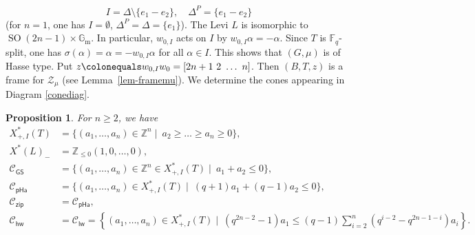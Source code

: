 \documentclass[11pt]{amsart}
\numberwithin{equation}{section}
\newtheorem{proposition}[theorem]{Proposition}
\theoremstyle{definition}
\theoremstyle{remark}
\newcommand{\pha}{\mathsf{pHa}}
\newcommand{\zipsf}{\mathsf{zip}}
\newcommand{\GSsf}{\mathsf{GS}}
\newcommand{\lwsf}{\mathsf{lw}}
\newcommand{\hwsf}{\mathsf{hw}}
\newcommand{\Ccal}{{\mathcal C}}
\newcommand{\Zcal}{{\mathcal Z}}
\newcommand{\FF}{\mathbb{F}}
\newcommand{\GG}{\mathbb{G}}
\newcommand{\ZZ}{\mathbb{Z}}
\DeclareMathOperator{\SO}{SO}
\begin{document}
\begin{equation}
    I=\Delta \setminus \{e_1-e_2\}, \quad \Delta^P=\{e_1-e_2\}
\end{equation}
(for $n=1$, one has $I=\emptyset$, $\Delta^P=\Delta=\{e_1\}$). The Levi $L$ is isomorphic to $\SO(2n-1)\times \GG_{\mathrm{m}}$. In particular, $w_{0,I}$ acts on $I$ by $w_{0,I}\alpha=-\alpha$. Since $T$ is $\FF_q$-split, one has $\sigma(\alpha)=\alpha=-w_{0,I}\alpha$ for all $\alpha\in I$. This shows that $(G,\mu)$ is of Hasse type. Put $z \colonequals w_{0,I}w_0 =[2n+1 \ 2 \  \dots  \ n]$. Then $(B,T,z)$ is a frame for $\Zcal_\mu$ (see Lemma~\ref{lem-framemu}). We determine the cones appearing in Diagram \eqref{conediag}.

\begin{proposition}\label{prop-SO}
For $n\geq 2$, we have
\allowdisplaybreaks
\begin{align*}
    X^*_{+,I}(T) & = \{ (a_1,\dots ,a_n)\in \ZZ^n \mid \  a_2\geq  \dots  \geq a_n \geq 0\}, \\
    X^*(L)_{-} &= \ZZ_{\leq 0}(1, 0,\dots ,0),  \\
    \Ccal_{\GSsf} &= \{(a_1,\dots ,a_n)\in \ZZ^n \in X^*_{+,I}(T) \mid \  a_1+a_2\leq 0 \},  \\
    \Ccal_{\pha} &= \{ (a_1,\dots ,a_n)\in X^*_{+,I}(T) \mid \   (q+1)a_1+(q-1)a_2\leq 0\}, \\
     \Ccal_{\zipsf} &= \Ccal_{\pha}, \\[-0.8em]
     \Ccal_{\hwsf} &= \Ccal_{\lwsf} =
     \left\{ (a_1,\dots ,a_n)\in X^*_{+,I}(T) \mid \  (q^{2n-2}-1) a_1 \leq (q-1)
     \sum\limits_{i=2}^n (q^{i-2}-q^{2n-1-i})  a_i\right\}.
\end{align*}
\end{proposition}
\end{document}
